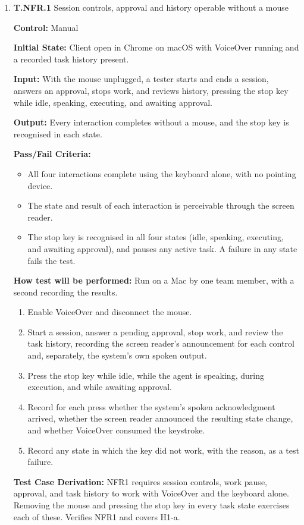 \documentclass[12pt, titlepage]{article}
\begin{document}
\begin{enumerate}

\item{\textbf{T.NFR.1} Session controls, approval and history operable without a mouse\\}\label{test:T.NFR.1}

\textbf{Control:} Manual

\textbf{Initial State:} Client open in Chrome on macOS with VoiceOver running and a recorded task history present.

\textbf{Input:} With the mouse unplugged, a tester starts and ends a session, answers an approval,
stops work, and reviews history, pressing the stop key while idle, speaking, executing, and awaiting approval.

\textbf{Output:} Every interaction completes without a mouse, and the stop key is recognised in each state.

\textbf{Pass/Fail Criteria:}
\begin{itemize}
  \item All four interactions complete using the keyboard alone, with no pointing device.
  \item The state and result of each interaction is perceivable through the screen reader.
  \item The stop key is recognised in all four states (idle, speaking, executing, and awaiting approval), and pauses any active task. A failure in any state fails the test.
\end{itemize}

\textbf{How test will be performed:} Run on a Mac by one team member, with a second recording the results.

\begin{enumerate}
  \item Enable VoiceOver and disconnect the mouse.
  \item Start a session, answer a pending approval, stop work, and review the task history, recording the screen reader's announcement for each control and, separately, the system's own spoken output.
  \item Press the stop key while idle, while the agent is speaking, during execution, and while awaiting approval.
  \item Record for each press whether the system's spoken acknowledgment arrived, whether the screen reader announced the resulting state change,
  and whether VoiceOver consumed the keystroke.
  \item Record any state in which the key did not work, with the reason, as a test failure.
\end{enumerate}

\textbf{Test Case Derivation:} NFR1 requires session controls, work pause, approval, and task history to work with VoiceOver and the keyboard alone. Removing the mouse and pressing the stop key in every task state exercises each of these. Verifies NFR1 and covers H1-a.

\end{enumerate}
\end{document}
